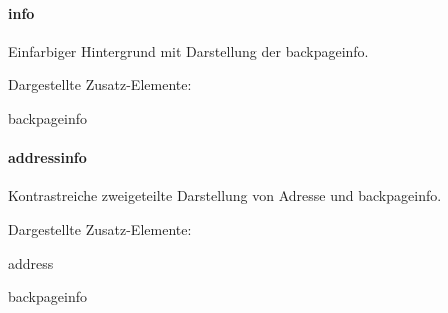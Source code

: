   \begin{minipage}[t]{0.33\textwidth}
    \null\centering\sffamily
  \end{minipage}%
  \hfill
  \begin{minipage}[t]{0.6\textwidth}
    \paragraph{info}
    \par
    Einfarbiger Hintergrund mit Darstellung der backpageinfo.
    \par\bigskip
    \par\bigskip
    Dargestellte Zusatz-Elemente:
    \begin{compactitem}\ttfamily
      \item backpageinfo
    \end{compactitem}
  \end{minipage}

  \begin{minipage}[t]{0.33\textwidth}
    \null\centering\sffamily
  \end{minipage}
  \hfill
  \begin{minipage}[t]{0.6\textwidth}
    \paragraph{addressinfo}
    \par
    Kontrastreiche zweigeteilte Darstellung von Adresse und backpageinfo.
    \par\bigskip
    \par\bigskip
    Dargestellte Zusatz-Elemente:
    \begin{compactitem}\ttfamily
      \item address
      \item backpageinfo
    \end{compactitem}
  \end{minipage}

